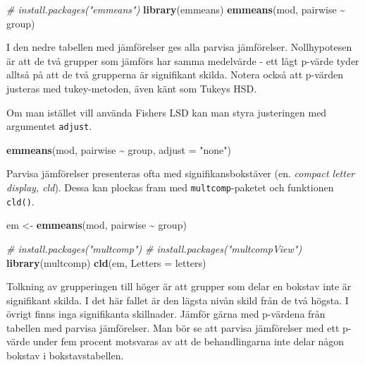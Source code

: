 \documentclass[
]{book}
\newenvironment{Shaded}{\begin{snugshade}}{\end{snugshade}}
\newcommand{\AttributeTok}[1]{\textcolor[rgb]{0.13,0.29,0.53}{#1}}
\newcommand{\CommentTok}[1]{\textcolor[rgb]{0.56,0.35,0.01}{\textit{#1}}}
\newcommand{\FunctionTok}[1]{\textcolor[rgb]{0.13,0.29,0.53}{\textbf{#1}}}
\newcommand{\NormalTok}[1]{#1}
\newcommand{\OtherTok}[1]{\textcolor[rgb]{0.56,0.35,0.01}{#1}}
\newcommand{\SpecialCharTok}[1]{\textcolor[rgb]{0.81,0.36,0.00}{\textbf{#1}}}
\newcommand{\StringTok}[1]{\textcolor[rgb]{0.31,0.60,0.02}{#1}}
\newcounter{none} %
\theoremstyle{definition}
\theoremstyle{definition}
\theoremstyle{definition}
\theoremstyle{definition}
\theoremstyle{remark}
\begin{document}
\begin{Shaded}
\begin{Highlighting}[]
\CommentTok{\# install.packages("emmeans")}
\FunctionTok{library}\NormalTok{(emmeans)}
\FunctionTok{emmeans}\NormalTok{(mod, pairwise }\SpecialCharTok{\textasciitilde{}}\NormalTok{ group)}
\end{Highlighting}
\end{Shaded}

I den nedre tabellen med jämförelser ges alla parvisa jämförelser. Nollhypotesen är att de två grupper som jämförs har samma medelvärde - ett lågt p-värde tyder alltså på att de två grupperna är signifikant skilda. Notera också att p-värden justeras med tukey-metoden, även känt som Tukeys HSD.

Om man istället vill använda Fishers LSD kan man styra justeringen med argumentet \texttt{adjust}.

\begin{Shaded}
\begin{Highlighting}[]
\FunctionTok{emmeans}\NormalTok{(mod, pairwise }\SpecialCharTok{\textasciitilde{}}\NormalTok{ group, }\AttributeTok{adjust =} \StringTok{"none"}\NormalTok{)}
\end{Highlighting}
\end{Shaded}

Parvisa jämförelser presenteras ofta med signifikansbokstäver (en. \emph{compact letter display, cld}). Dessa kan plockas fram med \texttt{multcomp}-paketet och funktionen \texttt{cld()}.

\begin{Shaded}
\begin{Highlighting}[]
\NormalTok{em }\OtherTok{\textless{}{-}} \FunctionTok{emmeans}\NormalTok{(mod, pairwise }\SpecialCharTok{\textasciitilde{}}\NormalTok{ group)}

\CommentTok{\# install.packages("multcomp")}
\CommentTok{\# install.packages("multcompView")}
\FunctionTok{library}\NormalTok{(multcomp)}
\FunctionTok{cld}\NormalTok{(em, }\AttributeTok{Letters =}\NormalTok{ letters)}
\end{Highlighting}
\end{Shaded}

Tolkning av grupperingen till höger är att grupper som delar en bokstav inte är signifikant skilda. I det här fallet är den lägsta nivån skild från de två högsta. I övrigt finns inga signifikanta skillnader. Jämför gärna med p-värdena från tabellen med parvisa jämförelser. Man bör se att parvisa jämförelser med ett p-värde under fem procent motsvaras av att de behandlingarna inte delar någon bokstav i bokstavstabellen.
\end{document}

